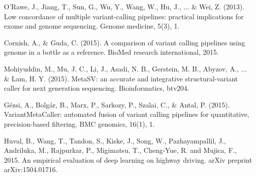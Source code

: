 \documentclass{article}
\begin{document}
\begin{thebibliography}{9}
O'Rawe, J., Jiang, T., Sun, G., Wu, Y., Wang, W., Hu, J., ... \& Wei, Z. (2013). Low concordance of multiple variant-calling pipelines: practical implications for exome and genome sequencing. Genome medicine, 5(3), 1.
 
 Cornish, A., \& Guda, C. (2015). A comparison of variant calling pipelines using genome in a bottle as a reference. BioMed research international, 2015.

Mohiyuddin, M., Mu, J. C., Li, J., Asadi, N. B., Gerstein, M. B., Abyzov, A., ... \& Lam, H. Y. (2015). MetaSV: an accurate and integrative structural-variant caller for next generation sequencing. Bioinformatics, btv204.

Gézsi, A., Bolgár, B., Marx, P., Sarkozy, P., Szalai, C., \& Antal, P. (2015). VariantMetaCaller: automated fusion of variant calling pipelines for quantitative, precision-based filtering. BMC genomics, 16(1), 1.

Huval, B., Wang, T., Tandon, S., Kiske, J., Song, W., Pazhayampallil, J., Andriluka, M., Rajpurkar, P., Migimatsu, T., Cheng-Yue, R. and Mujica, F., 2015. An empirical evaluation of deep learning on highway driving. arXiv preprint arXiv:1504.01716.

\end{thebibliography}
\end{document}
